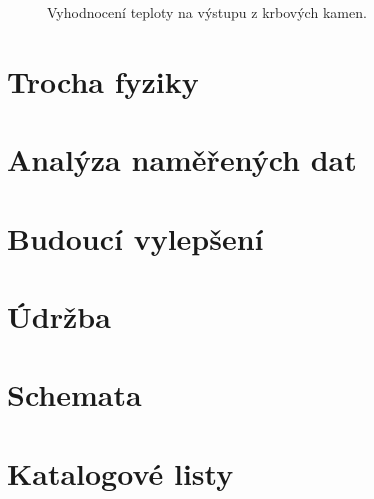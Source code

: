 \documentclass[a4paper,draft]{book}
\begin{document}
        \begin{figure}
            \begin{tikzpicture}
                
            \end{tikzpicture}
            \caption{Vyhodnocení teploty na výstupu z krbových kamen.}
        \end{figure}

    \chapter{Trocha fyziky}\label{chap:theory}

    \chapter{Analýza naměřených dat}\label{chap:analyze}

    \chapter{Budoucí vylepšení}\label{chap:future-improvements}

    \chapter{Údržba}\label{chap:maintenance}

\appendix

    \chapter{Schemata}

    \chapter{Katalogové listy}

\backmatter

\printindex


\end{document}
